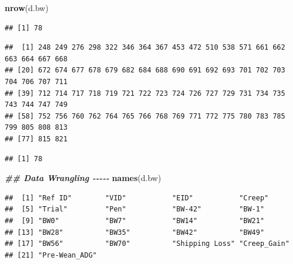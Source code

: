 \documentclass[
]{book}
\newenvironment{Shaded}{\begin{snugshade}}{\end{snugshade}}
\newcommand{\DocumentationTok}[1]{\textcolor[rgb]{0.56,0.35,0.01}{\textbf{\textit{#1}}}}
\newcommand{\FunctionTok}[1]{\textcolor[rgb]{0.13,0.29,0.53}{\textbf{#1}}}
\newcommand{\NormalTok}[1]{#1}
\newcommand{\SpecialCharTok}[1]{\textcolor[rgb]{0.81,0.36,0.00}{\textbf{#1}}}
\begin{document}
\begin{Shaded}
\begin{Highlighting}[]
\FunctionTok{nrow}\NormalTok{(d.bw)}
\end{Highlighting}
\end{Shaded}

\begin{verbatim}
## [1] 78
\end{verbatim}

\begin{Shaded}
\end{Shaded}

\begin{verbatim}
##  [1] 248 249 276 298 322 346 364 367 453 472 510 538 571 661 662 663 664 667 668
## [20] 672 674 677 678 679 682 684 688 690 691 692 693 701 702 703 704 706 707 711
## [39] 712 714 717 718 719 721 722 723 724 726 727 729 731 734 735 743 744 747 749
## [58] 752 756 760 762 764 765 766 768 769 771 772 775 780 783 785 799 805 808 813
## [77] 815 821
\end{verbatim}

\begin{Shaded}
\end{Shaded}

\begin{verbatim}
## [1] 78
\end{verbatim}

\begin{Shaded}
\begin{Highlighting}[]
\DocumentationTok{\#\# Data Wrangling {-}{-}{-}{-}{-}}
\FunctionTok{names}\NormalTok{(d.bw)}
\end{Highlighting}
\end{Shaded}

\begin{verbatim}
##  [1] "Ref ID"        "VID"           "EID"           "Creep"        
##  [5] "Trial"         "Pen"           "BW-42"         "BW-1"         
##  [9] "BW0"           "BW7"           "BW14"          "BW21"         
## [13] "BW28"          "BW35"          "BW42"          "BW49"         
## [17] "BW56"          "BW70"          "Shipping Loss" "Creep_Gain"   
## [21] "Pre-Wean_ADG"
\end{verbatim}
\end{document}
